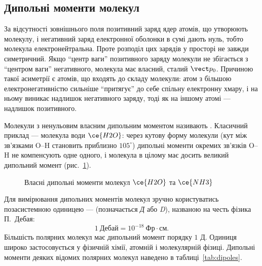 \subsection*{Дипольні моменти молекул}

За відсутності зовнішнього поля позитивний заряд ядер атомів, що утворюють молекулу, і негативний заряд електронної оболонки в сумі дають нуль, тобто
молекула електронейтральна. Проте розподіл цих зарядів у просторі не завжди симетричний. Якщо \enquote{центр ваги} позитивного заряду молекули не збігається
з \enquote{центром ваги} негативного, молекула має власний, сталий  $\vect p_0$. Причиною такої асиметрії є  атомів, що входять до складу молекули: атом з більшою електронегативністю сильніше \enquote{притягує} до себе спільну електронну
хмару, і на ньому виникає надлишок негативного заряду, тоді як на іншому атомі --- надлишок позитивного.

Молекули з ненульовим власним дипольним моментом називають . Класичний приклад --- молекула води $\ce{H2O}$: через кутову форму
молекули (кут між зв'язками O--H становить приблизно $105^\circ$) дипольні моменти окремих зв'язків O--H не компенсують одне одного, і молекула в
цілому має досить великий дипольний момент (рис.~\ref{pic:MoleculeDipoles}).

\begin{figure}[h!]\centering
	\caption{Власні дипольні моменти молекул $\ce{H2O}$ та $\ce{NH3}$\label{pic:MoleculeDipoles}}
\end{figure}

Для вимірювання дипольних моментів молекул зручно користуватись позасистемною одиницею ---  (позначається \textit{Д} або \textit{D}),
названою на честь фізика П.~Дебая:
\begin{equation*}
	1\ \text{Дебай} = 10^{-18}\ \text{Фр}\cdot\text{см}.
\end{equation*}
Більшість полярних молекул має дипольний момент порядку $1$ Д. Одиниця широко застосовується у фізичній хімії, атомній і молекулярній фізиці.
Дипольні моменти деяких відомих полярних молекул наведено в таблиці~\ref{tab:dipoles}.


